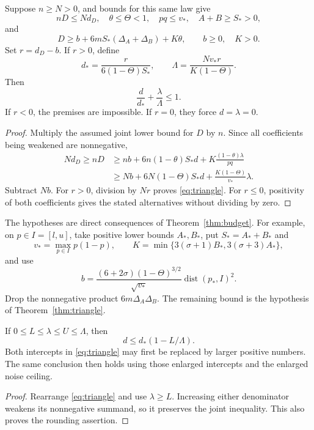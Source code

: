 \begin{theorem}\label{thm:triangle}
Suppose $n\ge N>0$, and bounds for this same law give
\[
 nD\le N d_D,\quad \theta\le\Theta<1,\quad pq\le v_*,
 \quad A+B\ge S_*>0,
\]
and
\[
 D\ge b+6mS_*(\Delta_A+\Delta_B)+K\theta,
 \qquad b\ge0,\quad K>0.
\]
Set $r=d_D-b$. If $r>0$, define
\[
 d_* =\frac{r}{6(1-\Theta)S_*},\qquad
 \Lambda=\frac{Nv_*r}{K(1-\Theta)}.
\]
Then
\begin{equation}\label{eq:triangle}
                 \boxed{\displaystyle
                   \frac d{d_*}+\frac\lambda\Lambda\le1.}
\end{equation}
If $r<0$, the premises are impossible. If $r=0$, they force
$d=\lambda=0$.
\end{theorem}
\begin{proof}
Multiply the assumed joint lower bound for $D$ by $n$. Since all
coefficients being weakened are nonnegative,
\begin{align*}
 Nd_D\ge nD
 &\ge nb+6n(1-\theta)S_*d+K\frac{(1-\theta)\lambda}{pq}\\
 &\ge Nb+6N(1-\Theta)S_*d+\frac{K(1-\Theta)}{v_*}\lambda.
\end{align*}
Subtract $Nb$. For $r>0$, division by $Nr$ proves
\eqref{eq:triangle}. For $r\le0$, positivity of both coefficients gives
the stated alternatives without dividing by zero.
\end{proof}

The hypotheses are direct consequences of Theorem~\ref{thm:budget}.
For example, on $p\in I=[l,u]$, take positive lower bounds $A_*,B_*$,
put $S_*=A_*+B_*$ and
\[
 v_* =\max_{p\in I}p(1-p),\qquad
 K=\min\{3(\sigma+1)B_*,3(\sigma+3)A_*\},
\]
and use
\[
 b=\frac{(6+2\sigma)(1-\Theta)^{3/2}}{\sqrt{v_*}}
           \operatorname{dist}(p_*,I)^2.
\]
Drop the nonnegative product $6m\Delta_A\Delta_B$.
The remaining bound is the hypothesis of Theorem~\ref{thm:triangle}.

\begin{corollary}
If $0\le L\le\lambda\le U\le\Lambda$, then
\[
                       d\le d_*(1-L/\Lambda).
\]
Both intercepts in \eqref{eq:triangle} may first be replaced by larger
positive numbers. The same conclusion then holds using those enlarged
intercepts and the enlarged noise ceiling.
\end{corollary}
\begin{proof}
Rearrange \eqref{eq:triangle} and use $\lambda\ge L$.
Increasing either denominator weakens its nonnegative summand, so it
preserves the joint inequality. This also proves the rounding assertion.
\end{proof}

